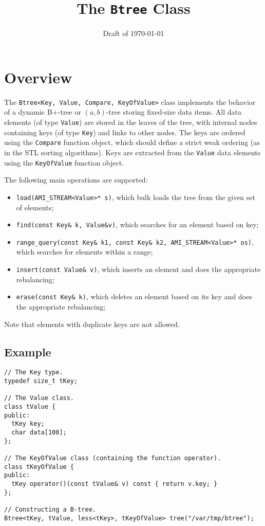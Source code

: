 \documentclass[11pt]{article}
\begin{document}
\title{\bf The {\tt Btree} Class}
\date{Draft of \today}
\author{}
\maketitle

\section{Overview}
\label{btree:overview}

The {\tt Btree<Key, Value, Compare, KeyOfValue>} class implements the
behavior of a dynamic B+-tree or $(a,b)$-tree storing fixed-size data
items. All data elements (of type {\tt Value}) are stored in the leaves of
the tree, with internal nodes containing keys (of type {\tt Key}) and links
to other nodes. The keys are ordered using the {\tt Compare} function
object, which should define a strict weak ordering (as in the STL sorting
algorithms). Keys are extracted from the {\tt Value} data elements using
the {\tt KeyOfValue} function object.

The following main operations are supported:
\begin{itemize}

  \item {\tt load(AMI\_STREAM<Value>* s)}, which bulk loads the tree from
  the given set of elements;

  \item {\tt find(const Key\& k, Value\&v)}, which searches for an element
  based on key;

  \item {\tt range\_query(const Key\& k1, const Key\& k2,
  AMI\_STREAM<Value>* os)}, which searches for elements within a range;

  \item {\tt insert(const Value\& v)}, which inserts an element and does
  the appropriate rebalancing;

  \item {\tt erase(const Key\& k)}, which deletes an element based on its
  key and does the appropriate rebalancing;
\end{itemize}

Note that elements with duplicate keys are not allowed.


\subsection{Example}
{\small
\begin{verbatim}
// The Key type.
typedef size_t tKey;

// The Value class.
class tValue {
public:
  tKey key;
  char data[100];
};

// The KeyOfValue class (containing the function operator).
class tKeyOfValue {
public:
  tKey operator()(const tValue& v) const { return v.key; }
};

// Constructing a B-tree.
Btree<tKey, tValue, less<tKey>, tKeyOfValue> tree("/var/tmp/btree");
\end{verbatim}
}
\end{document}
